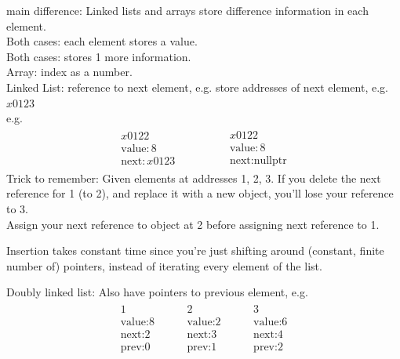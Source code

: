 \documentclass[10pt]{amsart}
\begin{document}
main difference: Linked lists and arrays store difference information in each element. \\

Both cases: each element stores a value. \\
Both cases: stores 1 more information. \\

Array: index as a number. \\
Linked List: reference to next element, e.g. store addresses of next element, e.g. $x0123$ \\
e.g.
\[
\begin{gathered}
\begin{gathered}
x0122 \\
\text{value}: 8 \\
\text{next}: x0123
\end{gathered} \qquad \qquad \, 
\begin{gathered}
x0122 \\
\text{value}: 8 \\
\text{next}: \text{nullptr}
\end{gathered}
\end{gathered}
\]
Trick to remember: Given elements at addresses 1, 2, 3. If you delete the next reference for 1 (to 2), and replace it with a new object, you'll lose your reference to 3. \\
Assign your next reference to object at 2 before assigning next reference to 1.

Insertion takes constant time since you're just shifting around (constant, finite number of) pointers, instead of iterating every element of the list.

Doubly linked list: Also have pointers to previous element, e.g.
\[
\begin{gathered}
\begin{gathered}
1 \\
\text{value:} 8 \\
\text{next:} 2 \\
\text{prev:} 0
\end{gathered} \qquad \, 
\begin{gathered}
2 \\
\text{value:} 2 \\
\text{next:} 3 \\
\text{prev:} 1
\end{gathered} \qquad \, 
\begin{gathered}
3 \\
\text{value:} 6 \\
\text{next:} 4 \\
\text{prev:} 2
\end{gathered}
\end{gathered}
\]
\end{document}
